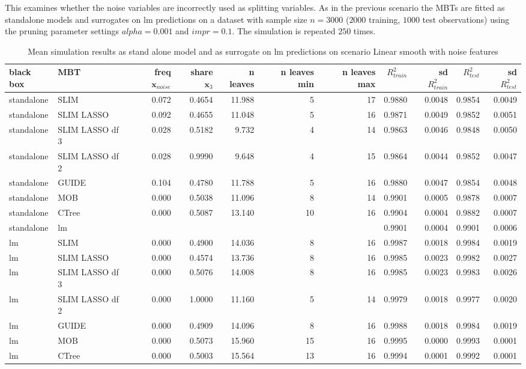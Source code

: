 This examines whether the noise variables are incorrectly used as splitting variables.
As in the previous scenario the MBTs are fitted as standalone models and surrogates on lm predictions on a dataset with sample size $ n = 3000$ ($2000$ training, $1000$ test observations) using the pruning parameter settings $alpha = 0.001$ and $impr = 0.1$. The simulation is repeated $250$ times.

\begin{table}[!htb]
\caption{Mean simulation results as stand alone model and as surrogate on lm predictions on scenario Linear smooth with noise features}
\centering \tiny
\begin{tabular}[t]{l|l|r|r|r|r|r|r|r|r|r}
\hline
black box & MBT & freq $ \textbf{x}_{noise}$  & share $\textbf{x}_3$ & n leaves & n leaves min & n leaves max & $R^2_{train}$  & sd $R^2_{train}$ & $R^2_{test}$ & sd $R^2_{test}$\\
\hline
standalone & SLIM & 0.072 & 0.4654 & 11.988 & 5 & 17 & 0.9880 & 0.0048 & 0.9854 & 0.0049\\
standalone & SLIM LASSO & 0.092 & 0.4655 & 11.048 & 5 & 16 & 0.9871 & 0.0049 & 0.9852 & 0.0051\\
standalone & SLIM LASSO df 3 & 0.028 & 0.5182 & 9.732 & 4 & 14 & 0.9863 & 0.0046 & 0.9848 & 0.0050\\
standalone & SLIM LASSO df 2 & 0.028 & 0.9990 & 9.648 & 4 & 15 & 0.9864 & 0.0044 & 0.9852 & 0.0047\\
standalone & GUIDE & 0.104 & 0.4780 & 11.788 & 5 & 16 & 0.9880 & 0.0047 & 0.9854 & 0.0048\\
standalone & MOB & 0.000 & 0.5038 & 11.096 & 8 & 14 & 0.9901 & 0.0005 & 0.9878 & 0.0007\\
standalone & CTree & 0.000 & 0.5087 & 13.140 & 10 & 16 & 0.9904 & 0.0004 & 0.9882 & 0.0007\\
\hline

standalone & lm & & & & & & 0.9901 & 0.0004 & 0.9901 & 0.0006\\

\hline
lm & SLIM & 0.000 & 0.4900 & 14.036 & 8 & 16 & 0.9987 & 0.0018 & 0.9984 & 0.0019\\
lm & SLIM LASSO & 0.000 & 0.4574 & 13.736 & 8 & 16 & 0.9985 & 0.0023 & 0.9982 & 0.0027\\
lm & SLIM LASSO df 3 & 0.000 & 0.5076 & 14.008 & 8 & 16 & 0.9985 & 0.0023 & 0.9983 & 0.0026\\
lm & SLIM LASSO df 2 & 0.000 & 1.0000 & 11.160 & 5 & 14 & 0.9979 & 0.0018 & 0.9977 & 0.0020\\
lm & GUIDE & 0.000 & 0.4909 & 14.096 & 8 & 16 & 0.9988 & 0.0018 & 0.9984 & 0.0019\\
lm & MOB & 0.000 & 0.5073 & 15.960 & 15 & 16 & 0.9995 & 0.0000 & 0.9993 & 0.0001\\
lm & CTree & 0.000 & 0.5003 & 15.564 & 13 & 16 & 0.9994 & 0.0001 & 0.9992 & 0.0001\\
\hline
\end{tabular}
\label{tab:linear_smooth_noisy_summary}
\end{table}

